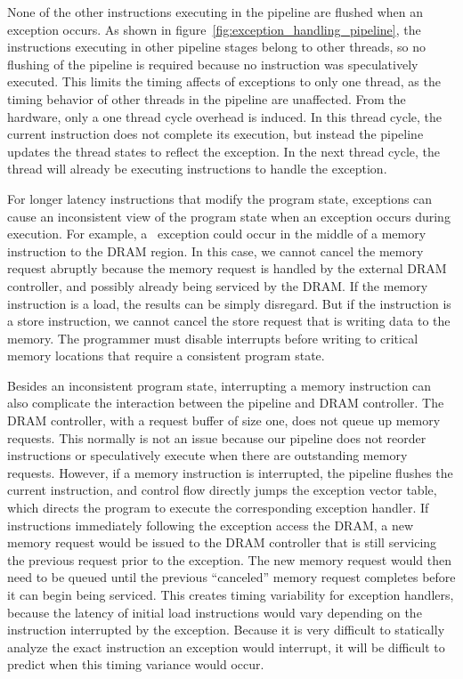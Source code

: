 None of the other instructions executing in the pipeline are flushed when an exception occurs. 
As shown in figure~\ref{fig:exception_handling_pipeline}, the instructions executing in other pipeline stages belong to other threads, so no flushing of the pipeline is required because no instruction was speculatively executed.
This limits the timing affects of exceptions to only one thread, as the timing behavior of other threads in the pipeline are unaffected.
From the hardware, only a one thread cycle overhead is induced. 
In this thread cycle, the current instruction does not complete its execution, but instead the pipeline updates the thread states to reflect the exception.   
In the next thread cycle, the thread will already be executing instructions to handle the exception.

For longer latency instructions that modify the program state, exceptions can cause an inconsistent view of the program state when an exception occurs during execution.   
For example, a \timerexpired\ exception could occur in the middle of a memory instruction to the DRAM region.
In this case, we cannot cancel the memory request abruptly because the memory request is handled by the external DRAM controller, and possibly already being serviced by the DRAM.
If the memory instruction is a load, the results can be simply disregard.
But if the instruction is a store instruction, we cannot cancel the store request that is writing data to the memory.
The programmer must disable interrupts before writing to critical memory locations that require a consistent program state.

Besides an inconsistent program state, interrupting a memory instruction can also complicate the interaction between the pipeline and DRAM controller.
The DRAM controller, with a request buffer of size one, does not queue up memory requests.
This normally is not an issue because our pipeline does not reorder instructions or speculatively execute when there are outstanding memory requests.
However, if a memory instruction is interrupted, the pipeline flushes the current instruction, and control flow directly jumps the exception vector table, which directs the program to execute the corresponding exception handler. 
If instructions immediately following the exception access the DRAM, a new memory request would be issued to the DRAM controller that is still servicing the previous request prior to the exception.
The new memory request would then need to be queued until the previous ``canceled'' memory request completes before it can begin being serviced.
This creates timing variability for exception handlers, because the latency of initial load instructions would vary depending on the instruction interrupted by the exception. 
Because it is very difficult to statically analyze the exact instruction an exception would interrupt, it will be difficult to predict when this timing variance would occur.    

